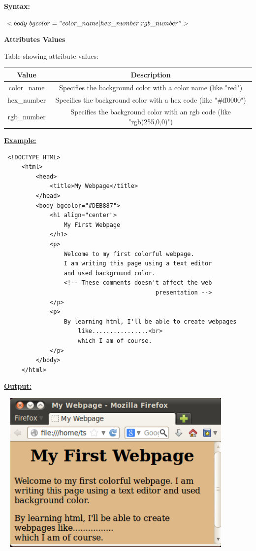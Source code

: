 \documentclass[11pt,a4paper]{article}
\begin{document}
\begin{description}
\textbf{Syntax:}\

$<body\  bgcolor="color\_name|hex\_number|rgb\_number">$\

\textbf{Attributes Values}\

Table showing attribute values:
\begin{center}
\begin{tabular}{| c | c |}\hline
\textbf{Value} & \textbf{Description} \\ \hline
color\_name & Specifies the background color with a color name (like "red") \\ \hline
hex\_number & Specifies the background color with a hex code (like "\#ff0000") \\ \hline
rgb\_number & Specifies the background color with an rgb code (like "rgb(255,0,0)") \\ \hline
\end{tabular}
\end{center}

\underline{\textbf{Example:}}
\begin{verbatim}
 <!DOCTYPE HTML>
     <html>
         <head>
             <title>My Webpage</title>
         </head>
         <body bgcolor="#DEB887">
             <h1 align="center">
                 My First Webpage 
             </h1>
             <p>
                 Welcome to my first colorful webpage.
                 I am writing this page using a text editor
                 and used background color.
                 <!-- These comments doesn't affect the web
                                           presentation -->
             </p>
             <p>
                 By learning html, I'll be able to create webpages 
                     like................<br>
                     which I am of course.
             </p>
         </body>
     </html>
\end{verbatim}  

\underline{\textbf{Output:}}\

\includegraphics[height = 80mm, width = 120mm]{Bgcolor.png}\


\end{description}
\end{document}

